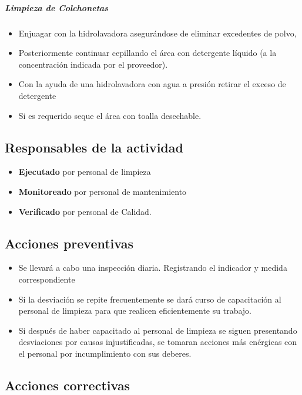 \subparagraph{Limpieza de Colchonetas}

\begin{itemize}
	\item Enjuagar con la hidrolavadora asegurándose de eliminar excedentes de polvo,
	\item Posteriormente continuar cepillando el área con detergente líquido (a la concentración indicada por el proveedor).
	\item Con la ayuda de una hidrolavadora con agua a presión retirar el exceso de detergente
	\item Si es requerido seque el área con toalla desechable.
\end{itemize}

\subsection{Responsables de la actividad}

\begin{itemize}
	\item \textbf{Ejecutado} por personal de limpieza
	\item \textbf{Monitoreado} por personal de mantenimiento
	\item \textbf{Verificado} por personal de Calidad.
\end{itemize}

\subsection{Acciones preventivas}

\begin{itemize}
	\item Se llevará a cabo una inspección diaria. Registrando el indicador y medida correspondiente
	\item Si la desviación se repite frecuentemente se dará curso de capacitación al personal de limpieza para que realicen eficientemente su trabajo.
	\item Si después de haber capacitado al personal de limpieza se siguen presentando desviaciones por causas injustificadas, se tomaran acciones más enérgicas con el personal por incumplimiento con sus deberes.
\end{itemize}

\subsection{Acciones correctivas}

